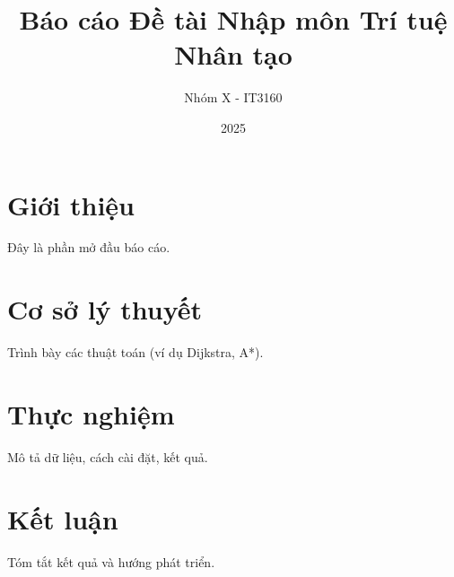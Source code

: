 \documentclass[12pt]{article}
\title{Báo cáo Đề tài Nhập môn Trí tuệ Nhân tạo}
\author{Nhóm X - IT3160}
\date{2025}
\begin{document}
\maketitle

\section{Giới thiệu}
Đây là phần mở đầu báo cáo.

\section{Cơ sở lý thuyết}
Trình bày các thuật toán (ví dụ Dijkstra, A*).

\section{Thực nghiệm}
Mô tả dữ liệu, cách cài đặt, kết quả.

\section{Kết luận}
Tóm tắt kết quả và hướng phát triển.
\end{document}
